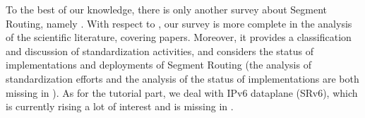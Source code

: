 To the best of our knowledge, there is only another survey about Segment Routing, namely \cite{abdullah2018segment}. With respect to \cite{abdullah2018segment}, our survey is more complete in the analysis of the scientific literature, covering \numTotalPapers papers. Moreover, it provides a classification and discussion of standardization activities, and considers the status of implementations and deployments of Segment Routing (the analysis of standardization efforts and the analysis of the status of implementations are both missing in \cite{abdullah2018segment}). As for the tutorial part, we deal with IPv6 dataplane (SRv6), which is currently rising a lot of interest and is missing in \cite{abdullah2018segment}.